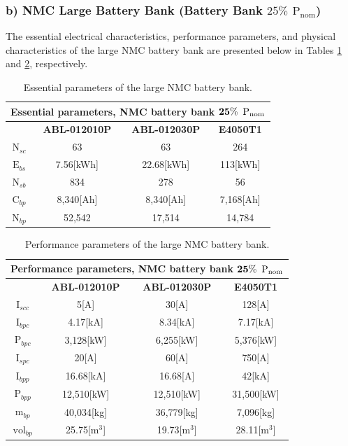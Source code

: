\subsubsection{b) NMC Large Battery Bank (Battery Bank $25\%$ ${\text{P}}_{\text{nom}}$)}

The essential electrical characteristics, performance parameters, and physical characteristics of the large NMC battery bank are presented below in Tables \ref{tab:NMC_025_1} and \ref{tab:NMC_025_2}, respectively.

\begin{table}[H]
	\centering
	\caption{Essential parameters of the large NMC battery bank.}
	\label{tab:NMC_025_1}
	\begin{tabular}{|c|c|c|c|}
		\hline
		\multicolumn{4}{|c|}{\textbf{Essential parameters, NMC battery bank} $\bf 25\%$ ${\bf \text{P}}_{\bf \text{nom}}$} \\
		\hline\hline
		 &  \textbf{ABL-012010P} & \textbf{ABL-012030P} & \textbf{E4050T1}\\
		 \hline
		$\text{N}_{sc}$ & 63 & 63 & 264 \\	
		\hline
		$\text{E}_{bs}$ & 7.56[kWh] & 22.68[kWh] & 113[kWh]\\	
		\hline
		$\text{N}_{sb}$ & 834 & 278 & 56\\	
		\hline
		$\text{C}_{bp}$ & 8,340[Ah]& 8,340[Ah] & 7,168[Ah]\\	
		\hline
		$\text{N}_{bp}$ &  52,542 & 17,514 &  14,784  \\	
		\hline		
	\end{tabular}
\end{table}

\begin{table}[H]
	\centering
	\caption{Performance parameters of the large NMC battery bank.}
	\label{tab:NMC_025_2}
	\begin{tabular}{|c|c|c|c|}
		\hline
		\multicolumn{4}{|c|}{\textbf{Performance parameters, NMC battery bank} $\bf 25\%$ ${\bf \text{P}}_{\bf \text{nom}}$} \\
		\hline\hline
		 &  \textbf{ABL-012010P} & \textbf{ABL-012030P} & \textbf{E4050T1}\\
		 \hline
		$\text{I}_{scc}$ & 5[A]  & 30[A] & 128[A] \\	
		\hline
		$\text{I}_{bpc}$ & 4.17[kA] & 8.34[kA] & 7.17[kA]\\	
		\hline
		$\text{P}_{bpc}$ & 3,128[kW]& 6,255[kW] & 5,376[kW]  \\	
		\hline
		$\text{I}_{spc}$ & 20[A] & 60[A] & 750[A] \\	
		\hline
		$\text{I}_{bpp}$ & 16.68[kA] & 16.68[A] & 42[kA]  \\	
		\hline
		$\text{P}_{bpp}$ & 12,510[kW] & 12,510[kW] & 31,500[kW]  \\	
		\hline
		$\text{m}_{bp}$ & 40,034[kg]  & 36,779[kg] & 7,096[kg] \\	
		\hline
		$\text{vol}_{bp}$ &  25.75[${\text{m}}^{3}$] & 19.73[${\text{m}}^{3}$] & 28.11[${\text{m}}^{3}$]\\	
		\hline		
	\end{tabular}
\end{table}

